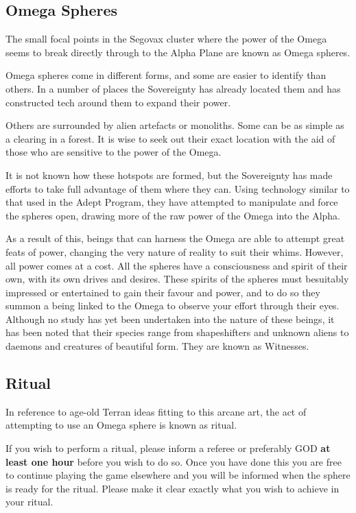 \subsection{Omega Spheres}

The small focal points in the Segovax cluster where the power of the Omega seems to break directly through to the Alpha Plane are known as Omega spheres.

Omega spheres come in different forms, and some are easier to identify than others. In a number of places the Sovereignty has already located them and has constructed tech around them to expand their power.

Others are surrounded by alien artefacts or monoliths. Some can be as simple as a clearing in a forest. It is wise to seek out their exact location with the aid of those who are sensitive to the power of the Omega.

It is not known how these hotspots are formed, but the Sovereignty has made efforts to take full advantage of them where they can. Using technology similar to that used in the Adept Program, they have attempted to manipulate and force the spheres open, drawing more of the raw power of the Omega into the Alpha.

As a result of this, beings that can harness the Omega are able to attempt great feats of power, changing the very nature of reality to suit their whims. However, all power comes at a cost. All the spheres have a consciousness and spirit of their own, with its own drives and desires. These spirits of the spheres must besuitably impressed or entertained to gain their favour and power, and to do so they summon a being linked to the Omega to observe your effort through their eyes. Although no study has yet been undertaken into the nature of these beings, it has been noted that their species range from shapeshifters and unknown aliens to daemons and creatures of beautiful form. They are known as Witnesses.

\subsection{Ritual}

In reference to age-old Terran ideas fitting to this arcane art, the act of attempting to use an Omega sphere is known as ritual.

If you wish to perform a ritual, please inform a referee or preferably GOD \textbf{at least one hour} before you wish to do so. Once you have done this you are free to continue playing the game elsewhere and you will be informed when the sphere is ready for the ritual. Please make it clear exactly what you wish to achieve in your ritual.

